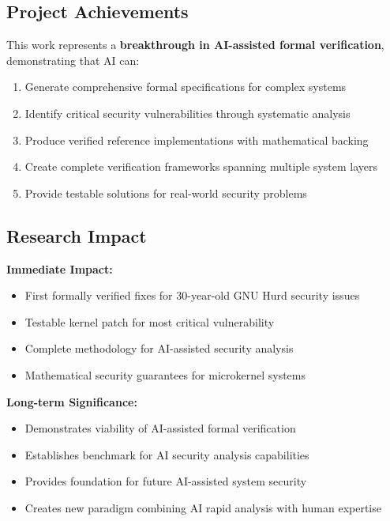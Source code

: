 \documentclass[11pt,a4paper]{article}
\begin{document}
\subsection{Project Achievements}

This work represents a \textbf{breakthrough in AI-assisted formal verification}, demonstrating that AI can:

\begin{enumerate}
    \item Generate comprehensive formal specifications for complex systems
    \item Identify critical security vulnerabilities through systematic analysis
    \item Produce verified reference implementations with mathematical backing
    \item Create complete verification frameworks spanning multiple system layers
    \item Provide testable solutions for real-world security problems
\end{enumerate}

\subsection{Research Impact}

\textbf{Immediate Impact:}
\begin{itemize}
    \item First formally verified fixes for 30-year-old GNU Hurd security issues
    \item Testable kernel patch for most critical vulnerability
    \item Complete methodology for AI-assisted security analysis
    \item Mathematical security guarantees for microkernel systems
\end{itemize}

\textbf{Long-term Significance:}
\begin{itemize}
    \item Demonstrates viability of AI-assisted formal verification
    \item Establishes benchmark for AI security analysis capabilities
    \item Provides foundation for future AI-assisted system security
    \item Creates new paradigm combining AI rapid analysis with human expertise
\end{itemize}
\end{document}
